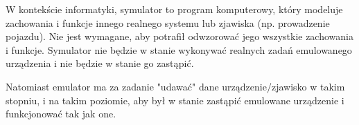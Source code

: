 	W kontekście informatyki, symulator to program komputerowy, który modeluje zachowania i funkcje innego realnego systemu lub zjawiska (np. prowadzenie pojazdu). Nie jest wymagane, aby potrafił odwzorować jego wszystkie zachowania i funkcje. Symulator nie będzie w stanie wykonywać realnych zadań emulowanego urządzenia i nie będzie w stanie go zastąpić.
	
	Natomiast emulator ma za zadanie "udawać" dane urządzenie/zjawisko w takim stopniu, i na takim poziomie, aby był w stanie zastąpić emulowane urządzenie i funkcjonować tak jak one.
	
		
